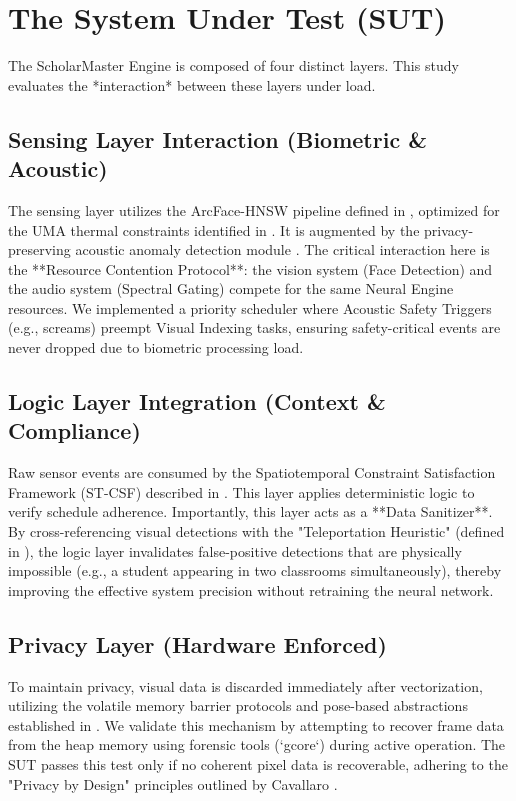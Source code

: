 \documentclass[conference]{IEEEtran}
\begin{document}
\section{The System Under Test (SUT)}
The ScholarMaster Engine is composed of four distinct layers. This study evaluates the *interaction* between these layers under load.

\subsection{Sensing Layer Interaction (Biometric \& Acoustic)}
The sensing layer utilizes the ArcFace-HNSW pipeline defined in \cite{p1}, optimized for the UMA thermal constraints identified in \cite{p5}. It is augmented by the privacy-preserving acoustic anomaly detection module \cite{p6}. The critical interaction here is the **Resource Contention Protocol**: the vision system (Face Detection) and the audio system (Spectral Gating) compete for the same Neural Engine resources. We implemented a priority scheduler where Acoustic Safety Triggers (e.g., screams) preempt Visual Indexing tasks, ensuring safety-critical events are never dropped due to biometric processing load.

\subsection{Logic Layer Integration (Context \& Compliance)}
Raw sensor events are consumed by the Spatiotemporal Constraint Satisfaction Framework (ST-CSF) described in \cite{p4}. This layer applies deterministic logic to verify schedule adherence. Importantly, this layer acts as a **Data Sanitizer**. By cross-referencing visual detections with the "Teleportation Heuristic" (defined in \cite{p4}), the logic layer invalidates false-positive detections that are physically impossible (e.g., a student appearing in two classrooms simultaneously), thereby improving the effective system precision without retraining the neural network.

\subsection{Privacy Layer (Hardware Enforced)}
To maintain privacy, visual data is discarded immediately after vectorization, utilizing the volatile memory barrier protocols and pose-based abstractions established in \cite{p3}. We validate this mechanism by attempting to recover frame data from the heap memory using forensic tools (`gcore`) during active operation. The SUT passes this test only if no coherent pixel data is recoverable, adhering to the "Privacy by Design" principles outlined by Cavallaro \cite{b13}.
\end{document}
